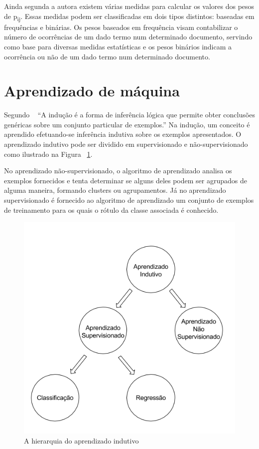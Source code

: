Ainda segunda a autora existem várias medidas para calcular os valores dos pesos de p\textsubscript{ij}. Essas medidas podem ser classificadas em dois tipos distintos: baseadas em frequências e binárias. Os pesos baseados em frequência visam contabilizar o número de ocorrências de um dado termo num determinado documento, servindo como base para diversas medidas estatísticas e os pesos binários indicam a ocorrência ou não de um dado termo num determinado documento.

\section{Aprendizado de máquina}

Segundo ~\cite{monard_baranauskas:2003} ``A indução é a forma de inferência lógica que permite obter conclusões genéricas sobre um conjunto particular de exemplos.'' Na indução, um conceito é aprendido efetuando-se inferência indutiva sobre os exemplos apresentados. O aprendizado indutivo pode ser dividido em supervisionado e não-supervisionado como ilustrado na Figura ~\ref{fig:aprendizado_maquina}.  

No aprendizado não-supervisionado, o algoritmo de aprendizado analisa os exemplos fornecidos e tenta determinar se alguns deles podem ser agrupados de alguma maneira, formando clusters ou agrupamentos. Já no aprendizado supervisionado é fornecido ao algoritmo de aprendizado um conjunto de exemplos de treinamento para os quais o rótulo da classe associada é conhecido.

\begin{figure}[H]
\begin{center}
    \includegraphics[scale=0.75]{figuras/aprendizado_maquina.png}
\end{center}
\caption{A hierarquia do aprendizado indutivo}
\label{fig:aprendizado_maquina}
\end{figure}

